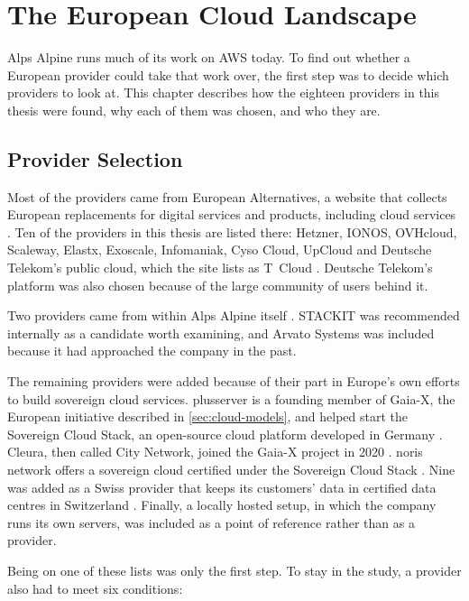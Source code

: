 \chapter{The European Cloud Landscape}
\label{ch:landscape}

Alps Alpine runs much of its work on \acs{AWS} today. To find out whether a
European provider could take that work over, the first step was to decide which
providers to look at. This chapter describes how the eighteen providers in this
thesis were found, why each of them was chosen, and who they are.

\section{Provider Selection}
\label{sec:provider-selection}

Most of the providers came from European Alternatives, a website that collects
European replacements for digital services and products, including cloud
services \cite{EuropeanAlternatives_Cloud}. Ten of the providers in this thesis
are listed there: Hetzner, IONOS, OVHcloud, Scaleway, Elastx, Exoscale,
Infomaniak, Cyso Cloud, UpCloud and Deutsche Telekom's public cloud, which the
site lists as T~Cloud \cite{EuropeanAlternatives_Cloud,EuropeanAlternatives_VPS}.
Deutsche Telekom's platform was also chosen because of the large community of
users behind it.

Two providers came from within Alps Alpine itself \cite{AlpsAlpine_Internal_2026}.
STACKIT was recommended internally as a candidate worth examining, and Arvato
Systems was included because it had approached the company in the past.

The remaining providers were added because of their part in Europe's own efforts
to build sovereign cloud services. plusserver is a founding member of Gaia-X, the
European initiative described in \cref{sec:cloud-models}, and helped start the
Sovereign Cloud Stack, an open-source cloud platform developed in Germany
\cite{Plusserver_Associations}. Cleura, then called City Network, joined the
Gaia-X project in 2020 \cite{Cleura_GaiaX_2020}. noris network offers a sovereign
cloud certified under the Sovereign Cloud Stack \cite{SCS_noris}. Nine was added
as a Swiss provider that keeps its customers' data in certified data centres in
Switzerland \cite{Nine_Infrastructure}. Finally, a locally hosted setup, in which
the company runs its own servers, was included as a point of reference rather than
as a provider.

Being on one of these lists was only the first step. To stay in the study, a
provider also had to meet six conditions:

